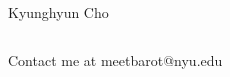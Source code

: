 \documentclass{beamer}
\begin{document}
\begin{frame}
\begin{columns}
    Kyunghyun Cho
\end{columns}
\vfill
\begin{columns}
    \column{\textwidth}
    \centering Contact me at meetbarot@nyu.edu
\end{columns}

\end{frame}

\begin{frame}
\printbibliography
\end{frame}
\end{document}
